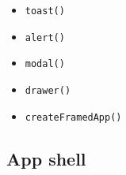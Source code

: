\begin{itemize}
  \begin{itemize}
  \tightlist
  \item
    \texttt{t\allowbreak{}o\allowbreak{}a\allowbreak{}s\allowbreak{}t\allowbreak{}(\allowbreak{})}
  \item
    \texttt{a\allowbreak{}l\allowbreak{}e\allowbreak{}r\allowbreak{}t\allowbreak{}(\allowbreak{})}
  \item
    \texttt{m\allowbreak{}o\allowbreak{}d\allowbreak{}a\allowbreak{}l\allowbreak{}(\allowbreak{})}
  \item
    \texttt{d\allowbreak{}r\allowbreak{}a\allowbreak{}w\allowbreak{}e\allowbreak{}r\allowbreak{}(\allowbreak{})}
  \item
    \texttt{c\allowbreak{}r\allowbreak{}e\allowbreak{}a\allowbreak{}t\allowbreak{}e\allowbreak{}F\allowbreak{}r\allowbreak{}a\allowbreak{}m\allowbreak{}e\allowbreak{}d\allowbreak{}A\allowbreak{}p\allowbreak{}p\allowbreak{}(\allowbreak{})}
  \end{itemize}
\end{itemize}

\subsection{App shell}\label{record-019-app-shell}


